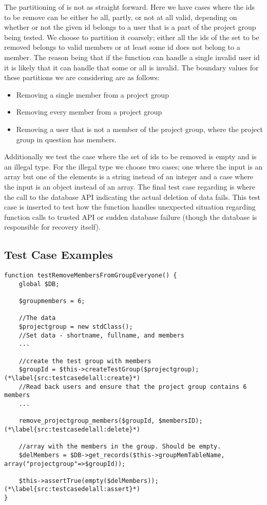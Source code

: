 The partitioning of \varuserids{} is not as straight forward.
Here we have cases where the ids to be remove can be either be all, partly, or not at all valid, depending on whether or not the given id belongs to a user that is a part of the project group being tested.
We choose to partition it coarsely; either all the ids of the set to be removed belongs to valid members or at least some id does not belong to a member.
The reason being that if the function can handle a single invalid user id it is likely that it can handle that some or all  is invalid.
The boundary values for these partitions we are considering are as follows: 
\begin{itemize}
	\item Removing a single member from a project group
	\item Removing every member from a project group
	\item Removing a user that is not a member of the project group, where the project group in question has members.
\end{itemize}
Additionally we test the case where the set of ids to be removed is empty and is an illegal type.
For the illegal type we choose two cases; one where the input is an array but one of the elements is a string instead of an integer and a case where the input is an object instead of an array.
The final test case regarding \varuserids{} is where the call to the database API indicating the actual deletion of data fails.
This test case is inserted to test how the function handles unexpected situation regarding function calls to trusted API or sudden database failure (though the database is responsible for recovery itself).

\subsection{Test Case Examples}
\label{sub:testCaseEg}
\begin{lstlisting}[style=phpCode, caption=\myCaption{A test case for the function \fu{remove\_projectgroup\_members}. The test case tests if the function correctly removes all the members of the project group when instructed to.}, label=src:testcasedelall]
function testRemoveMembersFromGroupEveryone() {
	global $DB;
	
	$groupmembers = 6;
	
	//The data
	$projectgroup = new stdClass(); 
	//Set data - shortname, fullname, and members
	...
	
	//create the test group with members
	$groupId = $this->createTestGroup($projectgroup); (*\label{src:testcasedelall:create}*)
	//Read back users and ensure that the project group contains 6 members
	...
	
	remove_projectgroup_members($groupId, $membersID); (*\label{src:testcasedelall:delete}*)
	
	//array with the members in the group. Should be empty.
	$delMembers = $DB->get_records($this->groupMemTableName, array("projectgroup"=>$groupId));
	
	$this->assertTrue(empty($delMembers)); (*\label{src:testcasedelall:assert}*)
}
\end{lstlisting}

